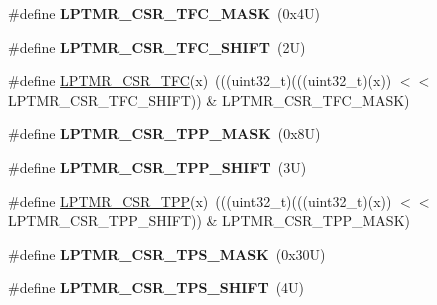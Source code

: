 \begin{DoxyCompactItemize}
\item 
\mbox{\label{group___l_p_t_m_r___register___masks_gaca581598c0f319b0002deda730479842}} 
\#define {\bfseries L\+P\+T\+M\+R\+\_\+\+C\+S\+R\+\_\+\+T\+F\+C\+\_\+\+M\+A\+SK}~(0x4\+U)
\item 
\mbox{\label{group___l_p_t_m_r___register___masks_gaee3d1b59f30f6217f1f74b18cf973c4a}} 
\#define {\bfseries L\+P\+T\+M\+R\+\_\+\+C\+S\+R\+\_\+\+T\+F\+C\+\_\+\+S\+H\+I\+FT}~(2\+U)
\item 
\#define \mbox{\hyperlink{group___l_p_t_m_r___register___masks_ga9f9f9658cf9a8a4d04923d1487adae6a}{L\+P\+T\+M\+R\+\_\+\+C\+S\+R\+\_\+\+T\+FC}}(x)~(((uint32\+\_\+t)(((uint32\+\_\+t)(x)) $<$$<$ L\+P\+T\+M\+R\+\_\+\+C\+S\+R\+\_\+\+T\+F\+C\+\_\+\+S\+H\+I\+FT)) \& L\+P\+T\+M\+R\+\_\+\+C\+S\+R\+\_\+\+T\+F\+C\+\_\+\+M\+A\+SK)
\item 
\mbox{\label{group___l_p_t_m_r___register___masks_ga020eee1550f2943c10d51f8b56930e62}} 
\#define {\bfseries L\+P\+T\+M\+R\+\_\+\+C\+S\+R\+\_\+\+T\+P\+P\+\_\+\+M\+A\+SK}~(0x8\+U)
\item 
\mbox{\label{group___l_p_t_m_r___register___masks_ga62be70d70bd4e88e26e5cc8437f6fd55}} 
\#define {\bfseries L\+P\+T\+M\+R\+\_\+\+C\+S\+R\+\_\+\+T\+P\+P\+\_\+\+S\+H\+I\+FT}~(3\+U)
\item 
\#define \mbox{\hyperlink{group___l_p_t_m_r___register___masks_ga1e706f8fb1de17fa05f83c3a8928a91c}{L\+P\+T\+M\+R\+\_\+\+C\+S\+R\+\_\+\+T\+PP}}(x)~(((uint32\+\_\+t)(((uint32\+\_\+t)(x)) $<$$<$ L\+P\+T\+M\+R\+\_\+\+C\+S\+R\+\_\+\+T\+P\+P\+\_\+\+S\+H\+I\+FT)) \& L\+P\+T\+M\+R\+\_\+\+C\+S\+R\+\_\+\+T\+P\+P\+\_\+\+M\+A\+SK)
\item 
\mbox{\label{group___l_p_t_m_r___register___masks_ga3502ccff1cbdb70bb99b73c035ab1e19}} 
\#define {\bfseries L\+P\+T\+M\+R\+\_\+\+C\+S\+R\+\_\+\+T\+P\+S\+\_\+\+M\+A\+SK}~(0x30\+U)
\item 
\mbox{\label{group___l_p_t_m_r___register___masks_ga7759d842742bfedd91788d41ef12fb8d}} 
\#define {\bfseries L\+P\+T\+M\+R\+\_\+\+C\+S\+R\+\_\+\+T\+P\+S\+\_\+\+S\+H\+I\+FT}~(4\+U)

\end{DoxyCompactItemize}
